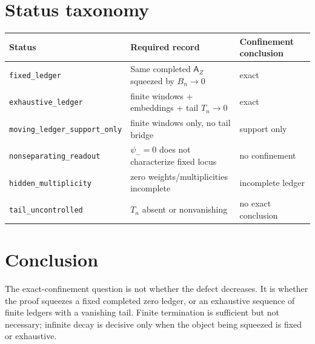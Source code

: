 \documentclass[11pt]{article}
\begin{document}
\section{Status taxonomy}

\begin{center}
\begin{tabular}{lll}
Status & Required record & Confinement conclusion\\
\hline
\texttt{fixed\_ledger} & Same completed $\mathsf A_Z$ squeezed by $B_n\to0$ & exact\\
\texttt{exhaustive\_ledger} & finite windows + embeddings + tail $T_n\to0$ & exact\\
\texttt{moving\_ledger\_support\_only} & finite windows only, no tail bridge & support only\\
\texttt{nonseparating\_readout} & $\psi_-=0$ does not characterize fixed locus & no confinement\\
\texttt{hidden\_multiplicity} & zero weights/multiplicities incomplete & incomplete ledger\\
\texttt{tail\_uncontrolled} & $T_n$ absent or nonvanishing & no exact conclusion\\
\end{tabular}
\end{center}

\section{Conclusion}
The exact-confinement question is not whether the defect decreases.  It is whether the proof squeezes a fixed completed zero ledger, or an exhaustive sequence of finite ledgers with a vanishing tail.  Finite termination is sufficient but not necessary; infinite decay is decisive only when the object being squeezed is fixed or exhaustive.
\end{document}
